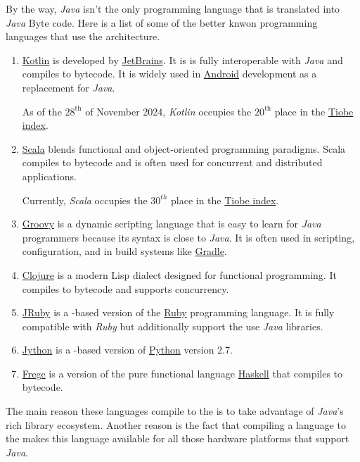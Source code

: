 By the way, \textsl{Java} isn't the only programming language that is translated into \textsl{Java} Byte code.
Here is a list of some of the better knwon programming languages that use the  architecture.
\begin{enumerate}
\item \href{https://kotlinlang.org}{Kotlin} is  
      developed by \href{https://www.jetbrains.com/}{JetBrains}. It is is fully interoperable with \textsl{Java}
      and compiles to  bytecode. It is widely used in
      \href{https://en.wikipedia.org/wiki/Android_(operating_system)}{Android} development as a replacement for 
      \textsl{Java}.

      As of the $28^\mathrm{th}$ of November 2024, \textsl{Kotlin} occupies the $20^{\mathrm{th}}$ place in the
      \href{https://www.tiobe.com/tiobe-index/}{Tiobe index}. 
\item \href{https://www.scala-lang.org}{Scala} 
       blends functional and object-oriented programming paradigms. Scala compiles to  bytecode
       and is often used for concurrent and distributed applications.

       Currently, \textsl{Scala} occupies the $30^{th}$ place in the
       \href{https://www.tiobe.com/tiobe-index/}{Tiobe index}.       
\item \href{https://groovy-lang.org}{Groovy} is a dynamic scripting language that is easy to learn for
      \textsl{Java} programmers because its syntax is close to \textsl{Java}. It is often used in scripting,
      configuration, and in build systems like \href{https://gradle.org}{Gradle}. 
\item \href{https://clojure.org}{Clojure}
      is a modern Lisp dialect designed for functional programming.
      It compiles to  bytecode and supports concurrency.
\item \href{https://www.jruby.org}{JRuby}
      is a -based version of the \href{https://www.ruby-lang.org}{Ruby} programming language.
      It is fully compatible with \textsl{Ruby} but additionally support the use \textsl{Java} libraries.
\item \href{https://www.jython.org}{Jython} 
      is a -based version of \href{https://www.python.org}{Python} version 2.7.
\item \href{https://github.com/Frege}{Frege}
      is a version of the pure functional language \href{https://www.haskell.org}{Haskell} that compiles to
       bytecode.  
\end{enumerate}
The main reason these languages compile to the  is to take advantage of \textsl{Java}'s rich library ecosystem.
Another reason is the fact that compiling a language to the  makes this language available for all those
hardware platforms that support \textsl{Java}.

